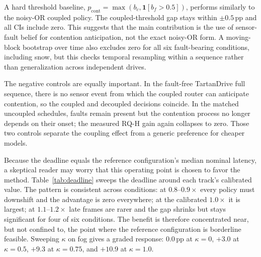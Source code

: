 \documentclass[conference]{IEEEtran}
\begin{document}
A hard threshold baseline,
$p_{\mathrm{cont}}=\max(b_c,\mathbf{1}[b_f>0.5])$, performs
similarly to the noisy-OR coupled policy. The coupled-threshold gap
stays within $\pm0.5$\,pp and all CIs include zero. This suggests
that the main contribution is the use of sensor-fault belief for
contention anticipation, not the exact noisy-OR form. A moving-block
bootstrap over time also excludes zero for all six fault-bearing
conditions, including snow, but this checks temporal resampling
within a sequence rather than generalization across independent
drives.

The negative controls are equally important. In the fault-free
TartanDrive full sequence, there is no sensor event from which the
coupled router can anticipate contention, so the coupled and
decoupled decisions coincide. In the matched uncoupled schedules,
faults remain present but the contention process no longer depends
on their onset; the measured RQ-H gain again collapses to zero.
Those two controls separate the coupling effect from a generic
preference for cheaper models.

Because the deadline equals the reference configuration's median
nominal latency, a skeptical reader may worry that this operating
point is chosen to favor the method. Table~\ref{tab:deadline} sweeps
the deadline around each track's calibrated value. The pattern is
consistent across conditions: at $0.8$--$0.9\times$ every policy must
downshift and the advantage is zero everywhere; at the calibrated
$1.0\times$ it is largest; at $1.1$--$1.2\times$ late frames are
rarer and the gap shrinks but stays significant for four of six
conditions. The benefit is therefore concentrated near, but not
confined to, the point where the reference configuration is
borderline feasible. Sweeping $\kappa$ on fog gives a graded
response: $0.0$\,pp at $\kappa=0$, $+3.0$ at $\kappa=0.5$, $+9.3$ at
$\kappa=0.75$, and $+10.9$ at $\kappa=1.0$.
\end{document}
